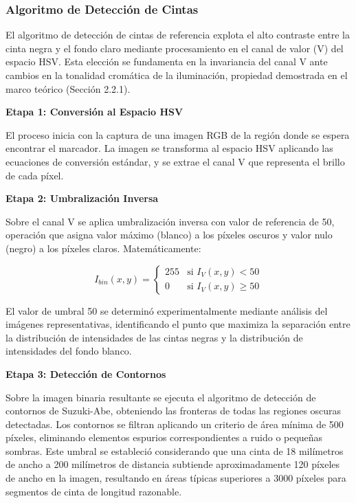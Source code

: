 \subsubsection{Algoritmo de Detección de Cintas}

El algoritmo de detección de cintas de referencia explota el alto contraste entre la cinta negra y el fondo claro mediante procesamiento en el canal de valor (V) del espacio HSV. Esta elección se fundamenta en la invariancia del canal V ante cambios en la tonalidad cromática de la iluminación, propiedad demostrada en el marco teórico (Sección 2.2.1).

\textbf{Etapa 1: Conversión al Espacio HSV}

El proceso inicia con la captura de una imagen RGB de la región donde se espera encontrar el marcador. La imagen se transforma al espacio HSV aplicando las ecuaciones de conversión estándar, y se extrae el canal V que representa el brillo de cada píxel.

\textbf{Etapa 2: Umbralización Inversa}

Sobre el canal V se aplica umbralización inversa con valor de referencia de 50, operación que asigna valor máximo (blanco) a los píxeles oscuros y valor nulo (negro) a los píxeles claros. Matemáticamente:

\begin{equation}
I_{bin}(x,y) = \begin{cases}
255 & \text{si } I_V(x,y) < 50 \\
0 & \text{si } I_V(x,y) \geq 50
\end{cases}
\end{equation}

El valor de umbral 50 se determinó experimentalmente mediante análisis del imágenes representativas, identificando el punto que maximiza la separación entre la distribución de intensidades de las cintas negras y la distribución de intensidades del fondo blanco.

\textbf{Etapa 3: Detección de Contornos}

Sobre la imagen binaria resultante se ejecuta el algoritmo de detección de contornos de Suzuki-Abe, obteniendo las fronteras de todas las regiones oscuras detectadas. Los contornos se filtran aplicando un criterio de área mínima de 500 píxeles, eliminando elementos espurios correspondientes a ruido o pequeñas sombras. Este umbral se estableció considerando que una cinta de 18 milímetros de ancho a 200 milímetros de distancia subtiende aproximadamente 120 píxeles de ancho en la imagen, resultando en áreas típicas superiores a 3000 píxeles para segmentos de cinta de longitud razonable.

